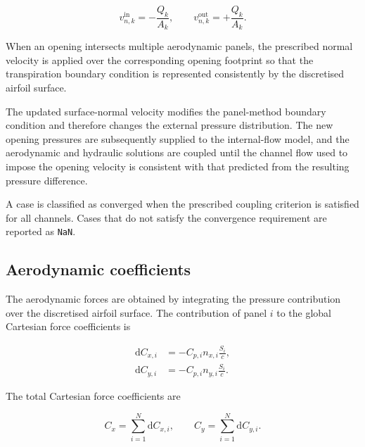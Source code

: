 \documentclass[a4paper,fleqn]{cas-dc}
\begin{document}
\begin{equation}
	v_{n,k}^{\mathrm{in}}
	=
	-\frac{Q_k}{A_k},
	\qquad
	v_{n,k}^{\mathrm{out}}
	=
	+\frac{Q_k}{A_k}.
	\label{eq:opening_transpiration}
\end{equation}

When an opening intersects multiple aerodynamic panels, the prescribed
normal velocity is applied over the corresponding opening footprint so
that the transpiration boundary condition is represented consistently
by the discretised airfoil surface.

The updated surface-normal velocity modifies the panel-method boundary
condition and therefore changes the external pressure distribution.
The new opening pressures are subsequently supplied to the
internal-flow model, and the aerodynamic and hydraulic solutions are
coupled until the channel flow used to impose the opening velocity is
consistent with that predicted from the resulting pressure difference.

A case is classified as converged when the prescribed coupling
criterion is satisfied for all channels. Cases that do not satisfy the
convergence requirement are reported as \texttt{NaN}.



\subsection{Aerodynamic coefficients}
\label{subsec:aerodynamic_coefficients}

The aerodynamic forces are obtained by integrating the pressure
contribution over the discretised airfoil surface. The contribution of
panel $i$ to the global Cartesian force coefficients is

\begin{align}
	\mathrm d C_{x,i}
	&=
	-C_{p,i}
	n_{x,i}
	\frac{S_i}{c},
	\label{eq:dcx}\\
	\mathrm d C_{y,i}
	&=
	-C_{p,i}
	n_{y,i}
	\frac{S_i}{c}.
	\label{eq:dcy}
\end{align}

The total Cartesian force coefficients are

\begin{equation}
	C_x
	=
	\sum_{i=1}^{N}
	\mathrm d C_{x,i},
	\qquad
	C_y
	=
	\sum_{i=1}^{N}
	\mathrm d C_{y,i}.
\end{equation}
\end{document}
